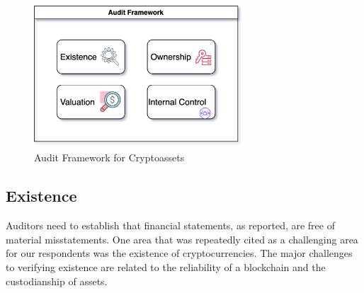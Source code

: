 \begin{figure}[h]
    \centering
    \includegraphics[width=0.7\textwidth]{figures/audit_framework.png}
    \caption{Audit Framework for Cryptoassets}
    \label{fig:dataflow}
\end{figure}	
	

\subsection{Existence} \label{sec:auditing:framework:existence}
Auditors need to establish that financial statements, as reported, are free of material misstatements. One area that was repeatedly cited as a challenging area for our respondents was the existence of cryptocurrencies. The major challenges to verifying existence are related to the reliability of a blockchain and the custodianship of assets.


